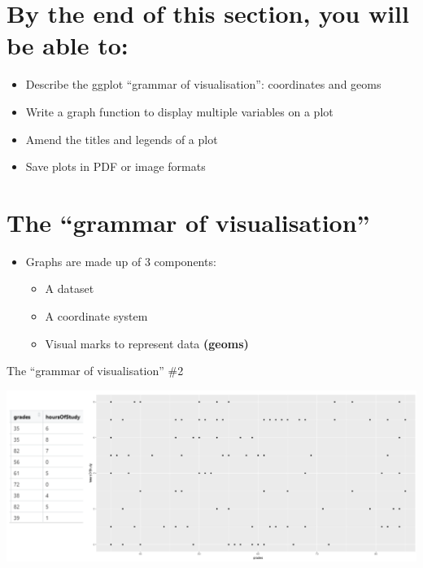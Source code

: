 \documentclass[
]{book}
\providecommand{\tightlist}{%
  \setlength{\itemsep}{0pt}\setlength{\parskip}{0pt}}
\begin{document}
\hypertarget{by-the-end-of-this-section-you-will-be-able-to-1}{%
\section{By the end of this section, you will be able to:}\label{by-the-end-of-this-section-you-will-be-able-to-1}}

\begin{itemize}
\tightlist
\item
  Describe the ggplot ``grammar of visualisation'': coordinates and geoms
\item
  Write a graph function to display multiple variables on a plot
\item
  Amend the titles and legends of a plot
\item
  Save plots in PDF or image formats
\end{itemize}

\hypertarget{the-grammar-of-visualisation}{%
\section{The ``grammar of visualisation''}\label{the-grammar-of-visualisation}}

\begin{itemize}
\tightlist
\item
  Graphs are made up of 3 components:

  \begin{itemize}
  \tightlist
  \item
    A dataset
  \item
    A coordinate system
  \item
    Visual marks to represent data \textbf{(geoms)}
  \end{itemize}
\end{itemize}

The ``grammar of visualisation'' \#2

\includegraphics[width=1\linewidth]{img/ggplot1}
\end{document}
